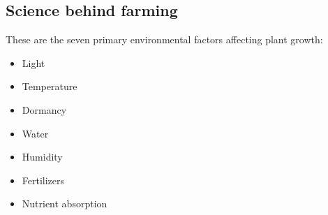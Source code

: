 \subsection{Science behind farming}
 
These are the seven primary environmental factors affecting plant growth:

\begin{itemize}
\item Light
\item Temperature
\item Dormancy
\item Water
\item Humidity
\item Fertilizers
\item Nutrient absorption
\end{itemize}
